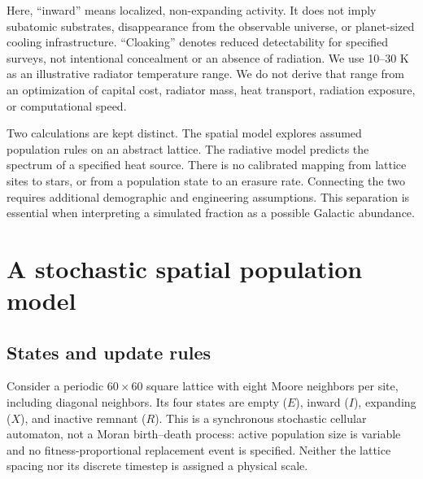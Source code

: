 \documentclass[10pt,twocolumn]{article}
\begin{document}
Here, ``inward'' means localized, non-expanding activity. It does not imply
subatomic substrates, disappearance from the observable universe, or
planet-sized cooling infrastructure. ``Cloaking'' denotes reduced
detectability for specified surveys, not intentional concealment or an
absence of radiation. We use 10--30 K as an illustrative radiator
temperature range. We do not derive that range from an optimization of
capital cost, radiator mass, heat transport, radiation exposure, or
computational speed.

Two calculations are kept distinct. The spatial model explores assumed
population rules on an abstract lattice. The radiative model predicts the
spectrum of a specified heat source. There is no calibrated mapping from
lattice sites to stars, or from a population state to an erasure rate.
Connecting the two requires additional demographic and engineering
assumptions. This separation is essential when interpreting a simulated
fraction as a possible Galactic abundance.

\section{A stochastic spatial population model}
\subsection{States and update rules}
Consider a periodic $60\times60$ square lattice with eight Moore
neighbors per site, including diagonal neighbors. Its four states are
empty ($E$), inward ($I$), expanding ($X$), and inactive remnant ($R$).
This is a synchronous stochastic cellular automaton, not a Moran
birth--death process: active population size is variable and no
fitness-proportional replacement event is specified. Neither the lattice
spacing nor its discrete timestep is assigned a physical scale.
\end{document}
